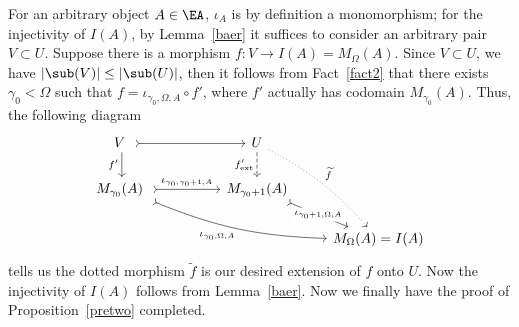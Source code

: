 \documentclass[twoside]{article}
\begin{document}
 For an arbitrary object $A \in \EA$, $\iota_A$ is by definition a monomorphism; for the injectivity of $I(A)$, by Lemma~\ref{baer} it suffices to consider an arbitrary pair $V \subset U$. Suppose there is a morphism $f\colon V \rightarrow I(A) = M_\Omega (A)$. Since $V \subset U$, we have $\left|\sub(V) \right| \leq \left|\sub(U) \right|$, then it follows from Fact~\ref{fact2} that there exists $\gamma_0 < \Omega$ such that $f =  \iota_{\gamma_0, \Omega, A} \circ f'$, where $f'$ actually has codomain $M_{\gamma_0}(A)$. Thus, the following diagram
$$
 \begin{tikzcd}
    V \ \ar[d, "f'"']  \ar[rr, tail] & & U \ar[d, dashed, "f'_{\mathrm{ext}}"'] \ar[ddr, dotted, bend left=10, "\widetilde{f}"] &\\
        M_{\gamma_0}(A) \ \ar[rr, tail, "\iota_{\gamma_0, \gamma_0 + 1, A}"] \ar[drrr, tail, bend right=10, "\iota_{\gamma_0, \Omega, A}"'] && M_{\gamma_0 +1}(A)  \ar[dr, tail, "\iota_{\gamma_0 + 1, \Omega, A}" description] & \\
        && & M_\Omega (A) = I(A)
\end{tikzcd}
$$
tells us the dotted morphism $\widetilde{f}$ is our desired extension of $f$ onto $U$. Now the injectivity of $I(A)$ follows from Lemma~\ref{baer}.
\epf
Now we finally have the proof of Proposition~\ref{pretwo} completed.
\epf

% 

% 

\printbibliography
\end{document}
